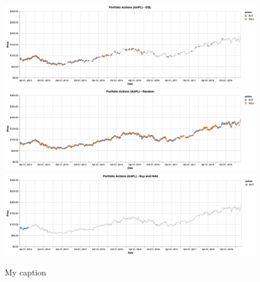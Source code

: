 \documentclass[12pt, authoryear]{elsarticle}
\begin{document}
\begin{figure}[h!]
  \begin{center} 
  	\caption{My caption}
  	\label{my-label}
	\includegraphics[scale=0.4]{figures/aapl_action_dql.png} \\
	\includegraphics[scale=0.4]{figures/aapl_action_rand.png} \\
	\includegraphics[scale=0.4]{figures/aapl_action_bh.png} \\
\end{center} 
\end{figure}
\end{document}
